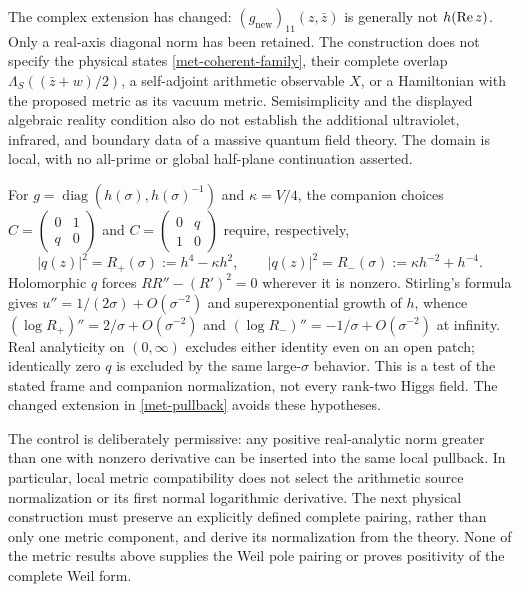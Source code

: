 The complex extension has changed:
$(g_{\mathrm{new}})_{11}(z,\bar z)$ is generally not $h(\operatorname{Re} z)$.
Only a real-axis diagonal norm has been retained.  The construction does not
specify the physical states \eqref{met-coherent-family}, their complete overlap
$\Lambda_S((\bar z+w)/2)$, a self-adjoint arithmetic observable $X$, or a
Hamiltonian with the proposed metric as its vacuum metric.  Semisimplicity
and the displayed algebraic reality condition also do not establish the
additional ultraviolet, infrared, and boundary data of a massive quantum
field theory.  The domain is local, with no all-prime or global half-plane
continuation asserted.

\begin{remark}
\label{met-companion-remark}
For $g=\operatorname{diag}(h(\sigma),h(\sigma)^{-1})$ and
$\kappa=V/4$, the companion choices
$C=\left(\begin{smallmatrix}0&1\\q&0\end{smallmatrix}\right)$ and
$C=\left(\begin{smallmatrix}0&q\\1&0\end{smallmatrix}\right)$ require,
respectively,
\[
 |q(z)|^2=R_+(\sigma):=h^4-\kappa h^2,
 \qquad
 |q(z)|^2=R_-(\sigma):=\kappa h^{-2}+h^{-4}.
\]
Holomorphic $q$ forces $RR''-(R')^2=0$ wherever it is nonzero.  Stirling's
formula gives $u''=1/(2\sigma)+O(\sigma^{-2})$ and superexponential growth of
$h$, whence $(\log R_+)''=2/\sigma+O(\sigma^{-2})$ and
$(\log R_-)''=-1/\sigma+O(\sigma^{-2})$ at infinity.
Real analyticity on $(0,\infty)$ excludes either identity even on an open
patch; identically zero $q$ is excluded by the same large-$\sigma$ behavior.
This is a test of the stated frame and companion normalization, not every
rank-two Higgs field.  The changed extension in \eqref{met-pullback} avoids
these hypotheses.
\end{remark}

The control is deliberately permissive: any positive real-analytic norm
greater than one with nonzero derivative can be inserted into the same local
pullback.  In particular, local metric compatibility does not select the
arithmetic source normalization or its first normal logarithmic derivative.
The next physical construction must preserve an explicitly defined complete
pairing, rather than only one metric component, and derive its normalization
from the theory.  None of the metric results above supplies the Weil pole
pairing or proves positivity of the complete Weil form.
